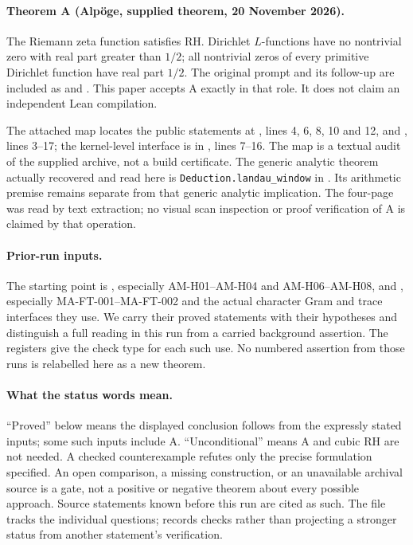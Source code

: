 \documentclass[11pt,a4paper]{article}
\theoremstyle{definition}
\theoremstyle{remark}
\begin{document}
\paragraph{Theorem A (Alp\"oge, supplied theorem, 20 November 2026).}
The Riemann zeta function satisfies RH. Dirichlet $L$-functions
have no nontrivial zero with real part greater than $1/2$;
all nontrivial zeros of every primitive Dirichlet function
have real part $1/2$. The original prompt and its follow-up
are included as  and
. This paper accepts A exactly in
that role. It does not claim an independent Lean compilation.

The attached map 
locates the public statements at , lines
4, 6, 8, 10 and 12, and , lines
3--17; the kernel-level interface is in
, lines 7--16.
The map is a textual audit of the supplied archive, not a
build certificate. The generic analytic theorem actually
recovered and read here is \texttt{Deduction.landau\_window}
in .
Its arithmetic premise remains separate from that
generic analytic implication. The four-page
 was read by text extraction;
no visual scan inspection or proof verification of A is
claimed by that operation.

\paragraph{Prior-run inputs.}
The starting point is
,
especially AM-H01--AM-H04 and AM-H06--AM-H08, and
,
especially MA-FT-001--MA-FT-002 and the actual character
Gram and trace interfaces they use. We carry their proved
statements with their hypotheses and distinguish a full
reading in this run from a carried background assertion.
The registers give the check type for each such use.
No numbered assertion from those runs is relabelled here
as a new theorem.

\paragraph{What the status words mean.}
``Proved'' below means the displayed conclusion follows
from the expressly stated inputs; some such inputs include A.
``Unconditional'' means A and cubic RH are not needed.
A checked counterexample refutes only the precise
formulation specified. An open comparison, a missing
construction, or an unavailable archival source is a
gate, not a positive or negative theorem about every
possible approach. Source statements known before this
run are cited as such. The file 
tracks the individual questions; 
records checks rather than projecting a stronger status
from another statement's verification.
\end{document}
